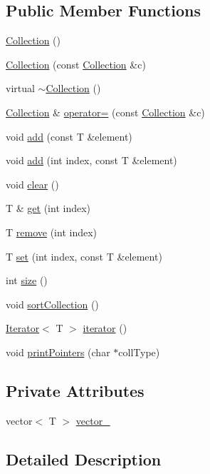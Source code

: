 \subsection*{Public Member Functions}
\begin{CompactItemize}
\item 
\hyperlink{classCollection_a0}{Collection} ()
\item 
\hyperlink{classCollection_a1}{Collection} (const  \hyperlink{classCollection}{Collection} \&c)
\item 
virtual \hyperlink{classCollection_a2}{$\sim$Collection} ()
\item 
\hyperlink{classCollection}{Collection} \& \hyperlink{classCollection_a3}{operator=} (const  \hyperlink{classCollection}{Collection} \&c)
\item 
void \hyperlink{classCollection_a4}{add} (const  T \&element)
\item 
void \hyperlink{classCollection_a5}{add} (int index, const  T \&element)
\item 
void \hyperlink{classCollection_a6}{clear} ()
\item 
T \& \hyperlink{classCollection_a7}{get} (int index)
\item 
T \hyperlink{classCollection_a8}{remove} (int index)
\item 
T \hyperlink{classCollection_a9}{set} (int index, const  T \&element)
\item 
int \hyperlink{classCollection_a10}{size} ()
\item 
void \hyperlink{classCollection_a11}{sort\-Collection} ()
\item 
\hyperlink{classIterator}{Iterator}$<$ T $>$ \hyperlink{classCollection_a12}{iterator} ()
\item 
void \hyperlink{classCollection_a13}{print\-Pointers} (char $\ast$coll\-Type)
\end{CompactItemize}
\subsection*{Private Attributes}
\begin{CompactItemize}
\item 
vector$<$ T $>$ \hyperlink{classCollection_r0}{vector\_\-}
\end{CompactItemize}


\subsection{Detailed Description}
